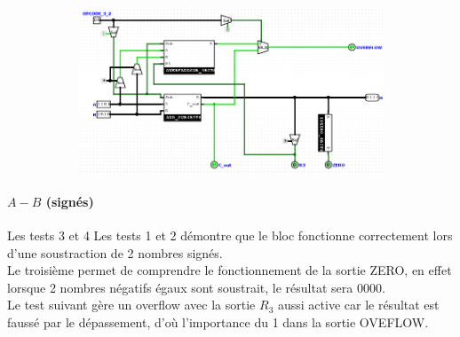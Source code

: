 \documentclass[a4paper]{article}
\begin{document}
\begin{tcolorbox}[colframe=Monokaimagenta,colback=white]
\begin{figure}[H]
   \begin{subfigure}{.7\textwidth}
        \centering
        \includegraphics[width=.8\linewidth]{src/ADDSUB_TEST_AplB1.png}
        \label{fig:COMPARATEUR_EXEMPLE_1}
   \end{subfigure}


\end{figure}

\paragraph{$A-B$ (signés)}
Les tests 3 et 4 Les tests 1 et 2 démontre que le bloc fonctionne correctement lors d'une soustraction de 2 nombres signés.\\
Le troisième permet de comprendre le fonctionnement de la sortie ZERO, en effet lorsque 2 nombres négatifs égaux sont soustrait, le résultat sera 0000.\\
Le test suivant gère un overflow avec la sortie $R_3$ aussi active car le résultat est faussé par le dépassement, d'où l'importance du 1 dans la sortie OVEFLOW.


\end{tcolorbox}
\end{document}
